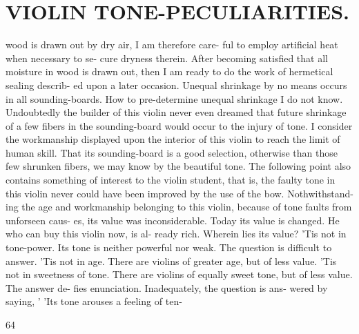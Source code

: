\documentclass{article}
\begin{document}
\section*{VIOLIN TONE-PECULIARITIES.}
wood is drawn out by dry air, I am therefore care- ful to employ artificial heat when necessary to se- cure dryness therein. After becoming satisfied that all moisture in wood is drawn out, then I am ready to do the work of hermetical sealing describ- ed upon a later occasion. Unequal shrinkage by no means occurs in all sounding-boards. How to pre-determine unequal shrinkage I do not know. Undoubtedly the builder of this violin never even dreamed that future shrinkage of a few fibers in the sounding-board would occur to the injury of tone. I consider the workmanship displayed upon the interior of this violin to reach the limit of human skill. That its sounding-board is a good selection, otherwise than those few shrunken fibers, we may know by the beautiful tone. The following point also contains something of interest to the violin student, that is, the faulty tone in this violin never could have been improved by the use of the bow. Nothwithstand- ing the age and workmanship belonging to this violin, because of tone faults from unforseen caus- es, its value was inconsiderable. Today its value is changed. He who can buy this violin now, is al- ready rich. Wherein lies its value? 'Tis not in tone-power. Its tone is neither powerful nor weak. The question is difficult to answer. 'Tis not in age. There are violins of greater age, but of less value. 'Tis not in sweetness of tone. There are violins of equally sweet tone, but of less value. The answer de- fies enunciation. Inadequately, the question is ans- wered by saying, ' 'Its tone arouses a feeling of ten-

64
\end{document}
